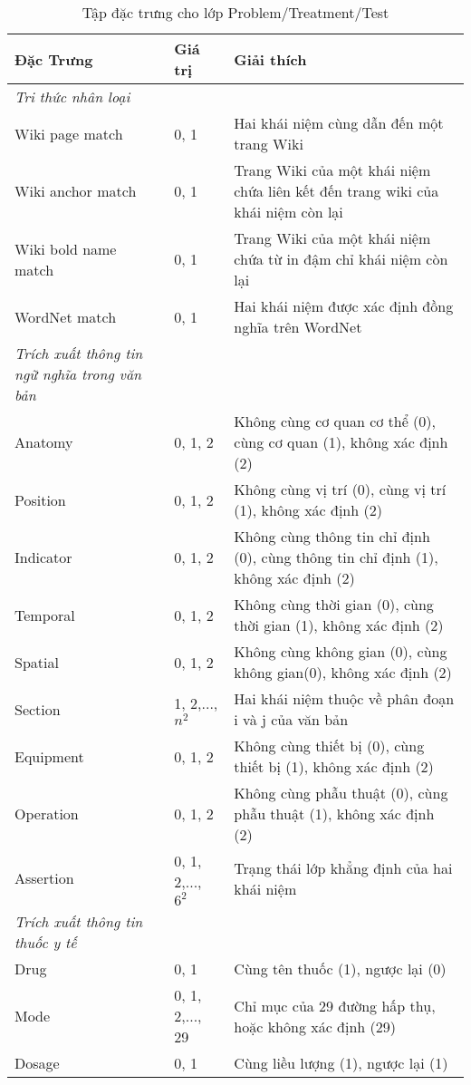 \begin{table}[th]
\centering{}
\caption{Tập đặc trưng cho lớp Problem/Treatment/Test \label{tab:ProbTreatTestFeatures}}
\footnotesize\sffamily

\begin{tabularx}{\textwidth}{@{}P{\raggedright}{0.3}lL@{}}
\toprule 
\textbf{Đặc Trưng} & \textbf{Giá trị} & \textbf{Giải thích}\\
\midrule
\textit{Tri thức nhân loại}\\
Wiki page match & 0, 1 & Hai khái niệm cùng dẫn đến một trang Wiki\\
Wiki anchor match & 0, 1 & Trang Wiki của một khái niệm chứa liên kết đến trang wiki của khái niệm còn lại\\
Wiki bold name match & 0, 1 & Trang Wiki của một khái niệm chứa từ in đậm chỉ khái niệm còn lại\\
WordNet match & 0, 1 & Hai khái niệm được xác định đồng nghĩa trên WordNet\\
\textit{Trích xuất thông tin ngữ nghĩa trong văn bản}\\
Anatomy & 0, 1, 2 & Không cùng cơ quan cơ thể (0), cùng cơ quan (1), không xác định (2)\\
Position & 0, 1, 2 & Không cùng vị trí (0), cùng vị trí (1), không xác định (2)\\
Indicator & 0, 1, 2 & Không cùng thông tin chỉ định (0), cùng thông tin chỉ định (1), không xác định (2)\\
Temporal & 0, 1, 2 & Không cùng thời gian (0), cùng thời gian (1), không xác định (2)\\
Spatial & 0, 1, 2 & Không cùng không gian (0), cùng không gian(0), không xác định (2)\\
Section & 1, 2,..., $n^{2}$ & Hai khái niệm thuộc về phân đoạn i và j của văn bản\\
Equipment & 0, 1, 2 & Không cùng thiết bị (0), cùng thiết bị (1), không xác định (2)\\
Operation & 0, 1, 2 & Không cùng phẫu thuật (0), cùng phẫu thuật (1), không xác định (2)\\
Assertion & 0, 1, 2,..., $6^{2}$ & Trạng thái lớp khẳng định của hai khái niệm\\
\textit{Trích xuất thông tin thuốc y tế}\\
Drug & 0, 1 & Cùng tên thuốc (1), ngược lại (0)\\
Mode & 0, 1, 2,..., 29 & Chỉ mục của 29 đường hấp thụ, hoặc không xác định (29)\\
Dosage & 0, 1 & Cùng liều lượng (1), ngược lại (1)\\

\end{tabularx}
\end{table}
